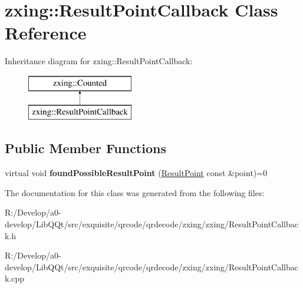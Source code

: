 \hypertarget{classzxing_1_1_result_point_callback}{}\section{zxing\+:\+:Result\+Point\+Callback Class Reference}
\label{classzxing_1_1_result_point_callback}
Inheritance diagram for zxing\+:\+:Result\+Point\+Callback\+:\begin{figure}[H]
\begin{center}
\leavevmode
\includegraphics[height=2.000000cm]{classzxing_1_1_result_point_callback}
\end{center}
\end{figure}
\subsection*{Public Member Functions}
\begin{DoxyCompactItemize}
\item 
\mbox{\label{classzxing_1_1_result_point_callback_aea894d8acd4b2ac9e21d0a95e4ce6d2f}} 
virtual void {\bfseries found\+Possible\+Result\+Point} (\mbox{\hyperlink{classzxing_1_1_result_point}{Result\+Point}} const \&point)=0
\end{DoxyCompactItemize}


The documentation for this class was generated from the following files\+:\begin{DoxyCompactItemize}
\item 
R\+:/\+Develop/a0-\/develop/\+Lib\+Q\+Qt/src/exquisite/qrcode/qrdecode/zxing/zxing/Result\+Point\+Callback.\+h\item 
R\+:/\+Develop/a0-\/develop/\+Lib\+Q\+Qt/src/exquisite/qrcode/qrdecode/zxing/zxing/Result\+Point\+Callback.\+cpp\end{DoxyCompactItemize}
